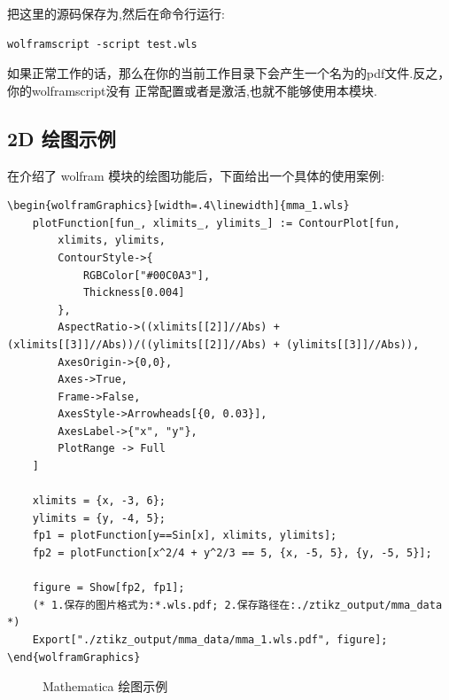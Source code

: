 把这里的源码保存为,然后在命令行运行:
\begin{verbatim}
wolframscript -script test.wls
\end{verbatim}

如果正常工作的话，那么在你的当前工作目录下会产生一个名为的pdf文件.反之，你的wolframscript没有
正常配置或者是激活,也就不能够使用本模块.


\subsection{2D 绘图示例}
在介绍了 wolfram 模块的绘图功能后，下面给出一个具体的使用案例:

\begin{verbatim}
\begin{wolframGraphics}[width=.4\linewidth]{mma_1.wls}
    plotFunction[fun_, xlimits_, ylimits_] := ContourPlot[fun, 
        xlimits, ylimits,
        ContourStyle->{
            RGBColor["#00C0A3"], 
            Thickness[0.004]
        },
        AspectRatio->((xlimits[[2]]//Abs) + (xlimits[[3]]//Abs))/((ylimits[[2]]//Abs) + (ylimits[[3]]//Abs)), 
        AxesOrigin->{0,0}, 
        Axes->True,
        Frame->False,
        AxesStyle->Arrowheads[{0, 0.03}],
        AxesLabel->{"x", "y"},
        PlotRange -> Full
    ]
    
    xlimits = {x, -3, 6};
    ylimits = {y, -4, 5};
    fp1 = plotFunction[y==Sin[x], xlimits, ylimits];
    fp2 = plotFunction[x^2/4 + y^2/3 == 5, {x, -5, 5}, {y, -5, 5}];
    
    figure = Show[fp2, fp1];
    (* 1.保存的图片格式为:*.wls.pdf; 2.保存路径在:./ztikz_output/mma_data *)
    Export["./ztikz_output/mma_data/mma_1.wls.pdf", figure];
\end{wolframGraphics}
\end{verbatim}

\begin{figure}[!htb]
    \centering
    \caption{Mathematica 绘图示例}
    \label{fig:mma-fig-1}
\end{figure}

